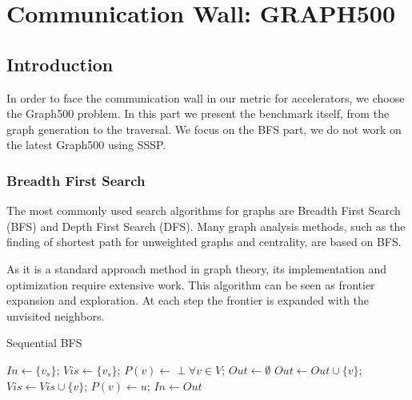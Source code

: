 
\chapter{Communication Wall: GRAPH500} 

\section{Introduction}
In order to face the communication wall in our metric for accelerators, we choose the Graph500 problem. 
In this part we present the benchmark itself, from the graph generation to the traversal. 
We focus on the BFS part, we do not work on the latest Graph500 using SSSP. 

\subsection{Breadth First Search}
The most commonly used search algorithms for graphs are Breadth First Search (BFS) and Depth First Search (DFS).
Many graph analysis methods, such as the finding of shortest path for unweighted graphs and centrality, are based on BFS. 

As it is a standard approach method in graph theory, its implementation and optimization require extensive work. 
This algorithm can be seen as frontier expansion and exploration. 
At each step the frontier is expanded with the unvisited neighbors.  

\begin{algorithm}
\caption{Sequential BFS}\label{alg:bfs_squential}
\begin{algorithmic}[1]
\State $In \gets \{v_s\}$;
\State $Vis \gets \{v_s\}$;
\State $P(v) \gets \perp \forall v \in V$;
	\State $Out \gets \emptyset$
				\State $Out \leftarrow Out \cup \{v\}$;
				\State $Vis \gets Vis \cup \{v\}$;
				\State $P(v) \leftarrow u$;
			\EndIf
		\EndFor
	\EndFor
	\State $In \gets Out$
\EndWhile
\EndFunction
\end{algorithmic}
\end{algorithm}

